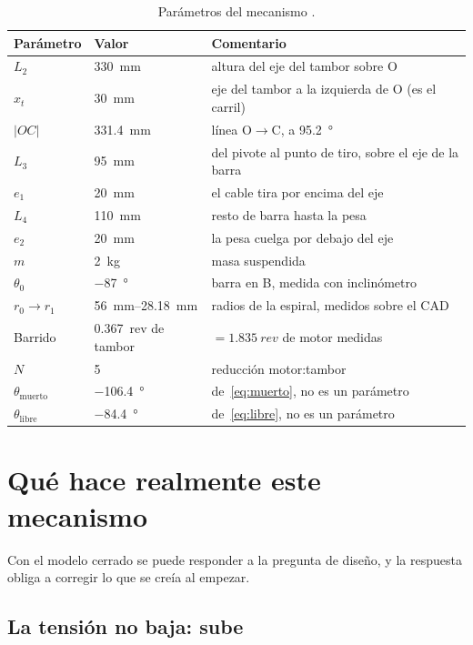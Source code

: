 \begin{table}[H]
\centering
\caption{Parámetros del mecanismo .}
\label{tab:geometria}
\begin{tabular}{@{}lll@{}}
\toprule
Parámetro & Valor & Comentario \\
\midrule
$L_2$ & \SI{330}{\milli\metre} & altura del eje del tambor sobre O \\
$x_t$ & \SI{30}{\milli\metre} & eje del tambor a la izquierda de O (es el carril) \\
$|OC|$ & \SI{331.4}{\milli\metre} & línea O$\to$C, a \SI{95.2}{\degree} \\
$L_3$ & \SI{95}{\milli\metre} & del pivote al punto de tiro, sobre el eje de la barra \\
$e_1$ & \SI{20}{\milli\metre} & el cable tira por encima del eje \\
$L_4$ & \SI{110}{\milli\metre} & resto de barra hasta la pesa \\
$e_2$ & \SI{20}{\milli\metre} & la pesa cuelga por debajo del eje \\
$m$ & \SI{2}{\kilo\gram} & masa suspendida \\
$\theta_0$ & \SI{-87}{\degree} & barra en B, medida con inclinómetro \\
$r_0 \to r_1$ & \SIrange{56}{28.18}{\milli\metre} & radios de la espiral, medidos sobre el CAD \\
Barrido & \SI{0.367}{rev} de tambor & $=\SI{1.835}{rev}$ de motor medidas \\
$N$ & 5 & reducción motor:tambor \\
\midrule
$\theta_{\text{muerto}}$ & \SI{-106.4}{\degree} & de~\eqref{eq:muerto}, no es un parámetro \\
$\theta_{\text{libre}}$ & \SI{-84.4}{\degree} & de~\eqref{eq:libre}, no es un parámetro \\
\bottomrule
\end{tabular}
\end{table}

\section{Qué hace realmente este mecanismo}
\label{sec:mod-porque}

Con el modelo cerrado se puede responder a la pregunta de diseño, y la respuesta obliga a corregir
lo que se creía al empezar.

\subsection{La tensión no baja: sube}

